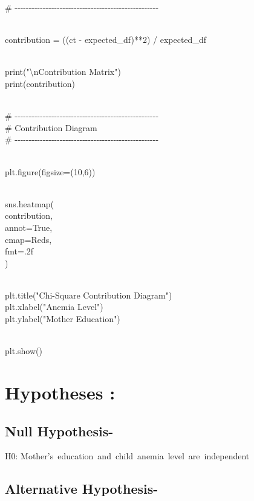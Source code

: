 \documentclass[
]{article}
\begin{document}
\#
-\/-\/-\/-\/-\/-\/-\/-\/-\/-\/-\/-\/-\/-\/-\/-\/-\/-\/-\/-\/-\/-\/-\/-\/-\/-\/-\/-\/-\/-\/-\/-\/-\/-\/-\/-\/-\/-\/-\/-\/-\/-\/-\/-\/-\/-\/-\/-\/-\/-\/-\\
\strut \\
contribution = ((ct - expected\_df)**2) / expected\_df\\
\strut \\
print("\textbackslash nContribution Matrix")\\
print(contribution)\\
\strut \\
\#
-\/-\/-\/-\/-\/-\/-\/-\/-\/-\/-\/-\/-\/-\/-\/-\/-\/-\/-\/-\/-\/-\/-\/-\/-\/-\/-\/-\/-\/-\/-\/-\/-\/-\/-\/-\/-\/-\/-\/-\/-\/-\/-\/-\/-\/-\/-\/-\/-\/-\/-\\
\# Contribution Diagram\\
\#
-\/-\/-\/-\/-\/-\/-\/-\/-\/-\/-\/-\/-\/-\/-\/-\/-\/-\/-\/-\/-\/-\/-\/-\/-\/-\/-\/-\/-\/-\/-\/-\/-\/-\/-\/-\/-\/-\/-\/-\/-\/-\/-\/-\/-\/-\/-\/-\/-\/-\/-\\
\strut \\
plt.figure(figsize=(10,6))\\
\strut \\
sns.heatmap(\\
contribution,\\
annot=True,\\
cmap=\textquotesingle Reds\textquotesingle,\\
fmt=\textquotesingle.2f\textquotesingle{}\\
)\\
\strut \\
plt.title("Chi-Square Contribution Diagram")\\
plt.xlabel("Anemia Level")\\
plt.ylabel("Mother Education")\\
\strut \\
plt.show()

\section{Hypotheses :}\label{hypotheses}

\subsection{Null Hypothesis-}\label{null-hypothesis-}

H0: Mother's~education~and~child~anemia~level~are~independent

\subsection{Alternative Hypothesis-}\label{alternative-hypothesis-}
\end{document}
